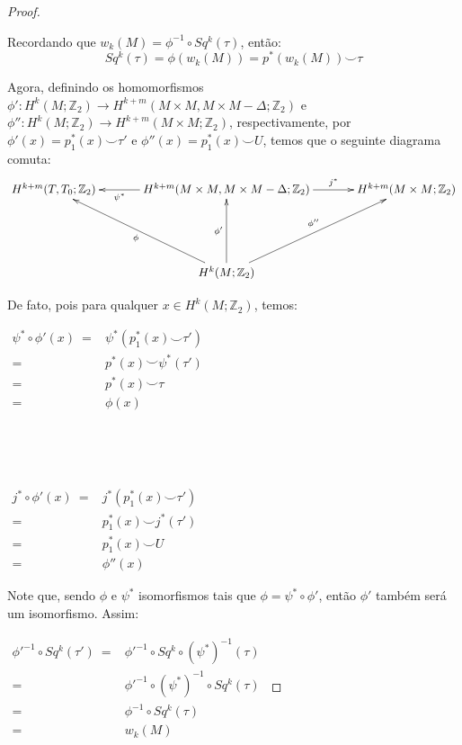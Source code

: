 \documentclass[12pt,oneside]{book} %
\newcommand{\Z}{\mathbb{Z}}
\newcommand{\ccup}{\smile}
\begin{document}
\begin{proof}
	
	\
	
	\par Recordando que $w_{k}(M)=\phi^{-1}\circ Sq^{k}(\tau)$, então:
	$$ Sq^{k}(\tau)=\phi(w_{k}(M))=p^{*}(w_{k}(M))\ccup \tau $$
	
	\par Agora, definindo os homomorfismos $\phi':H^{k}(M;\Z_{2})\to H^{k+m}(M\times M,M\times M-\Delta;\Z_{2})$ e $\phi'':H^{k}(M;\Z_{2})\to H^{k+m}(M\times M;\Z_{2})$, respectivamente, por $\phi'(x)=p_{1}^{*}(x)\ccup \tau'$ e $\phi''(x)=p_{1}^{*}(x)\ccup U$, temos que o seguinte diagrama comuta:
	$$ \xymatrix @C=0.5cm {
		H^{k+m}(T,T_{0};\Z_{2}) && H^{k+m}(M\times M,M\times M-\Delta;\Z_{2}) \ar[ll]^-{\psi^{*}} \ar[rr]^-{j^{*}} && H^{k+m}(M\times M;\Z_{2}) \\
		&& && \\	 
		&& H^{k}(M;\Z_{2}) \ar[lluu]^-{\phi} \ar[uu]^-{\phi'} \ar[rruu]^-{\phi''} &&
	} $$
	
	\par De fato, pois para qualquer $x\in H^{k}(M;\Z_{2})$, temos: \newline
	
	$ \begin{array}{rl}
		\psi^{*}\circ\phi'(x) \ = 	& \psi^{*}(p_{1}^{*}(x)\ccup \tau') \\
		= 	& p^{*}(x)\ccup \psi^{*}(\tau') \\
		=	& p^{*}(x)\ccup \tau \\
		=	& \phi(x)
	\end{array} $
	
	\
	
	\
	
	$ \begin{array}{rl}
		j^{*}\circ\phi'(x) \ =	& j^{*}(p_{1}^{*}(x)\ccup \tau') \\
		=	& p_{1}^{*}(x)\ccup j^{*}(\tau') \\
		= 	& p_{1}^{*}(x)\ccup U \\
		=	& \phi''(x)   \end{array} $ \newline
	
	\par Note que, sendo $\phi$ e $\psi^{*}$ isomorfismos tais que $\phi=\psi^{*}\circ \phi'$, então $\phi'$ também será um isomorfismo. Assim: \newline
	
	$ \begin{array}{rl}
		\phi'^{-1}\circ Sq^{k}(\tau') \ =	& \phi'^{-1}\circ Sq^{k}\circ (\psi^{*})^{-1}(\tau) \\
		=	& \phi'^{-1}\circ (\psi^{*})^{-1}\circ Sq^{k}(\tau) \\
		=	& \phi^{-1}\circ Sq^{k}(\tau) \\
		=	& w_{k}(M)
	\end{array} $ \newline
	

\end{proof}
\end{document}
